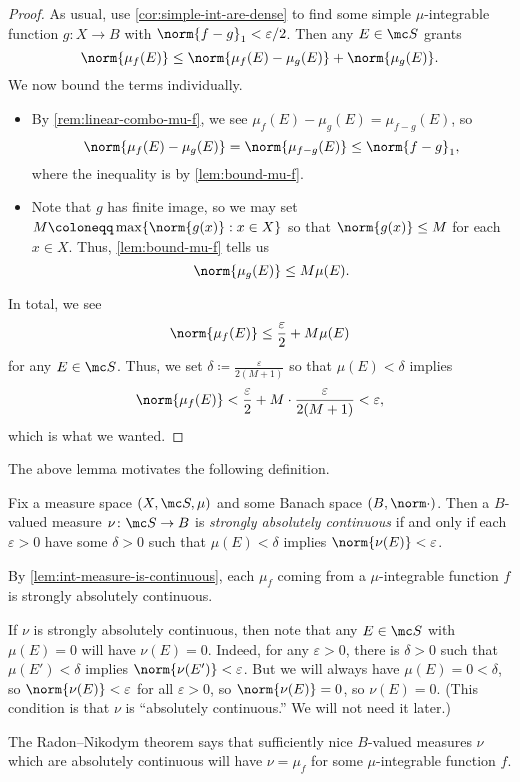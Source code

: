 \documentclass[../notes.tex]{subfiles}
\begin{document}
\begin{proof}
	As usual, use \autoref{cor:simple-int-are-dense} to find some simple $\mu$-integrable function $g\colon X\to B$ with $\norm{f-g}_1<\varepsilon/2$. Then any $E\in\mc S$ grants
	\[\norm{\mu_f(E)}\le\norm{\mu_f(E)-\mu_g(E)}+\norm{\mu_g(E)}.\]
	We now bound the terms individually.
	\begin{itemize}
		\item By \autoref{rem:linear-combo-mu-f}, we see $\mu_f(E)-\mu_g(E)=\mu_{f-g}(E)$, so
		\[\norm{\mu_f(E)-\mu_g(E)}=\norm{\mu_{f-g}(E)}\le\norm{f-g}_1,\]
		where the inequality is by \autoref{lem:bound-mu-f}.
		\item Note that $g$ has finite image, so we may set $M\coloneqq\max\{\norm{g(x)}:x\in X\}$ so that $\norm{g(x)}\le M$ for each $x\in X$. Thus, \autoref{lem:bound-mu-f} tells us
		\[\norm{\mu_g(E)}\le M\mu(E).\]
	\end{itemize}
	In total, we see
	\[\norm{\mu_f(E)}\le\frac\varepsilon2+M\mu(E)\]
	for any $E\in\mc S$. Thus, we set $\delta\coloneqq\frac\varepsilon{2(M+1)}$ so that $\mu(E)<\delta$ implies
	\[\norm{\mu_f(E)}<\frac\varepsilon2+M\cdot\frac\varepsilon{2(M+1)}<\varepsilon,\]
	which is what we wanted.
\end{proof}
The above lemma motivates the following definition.
\begin{definition}
	Fix a measure space $(X,\mc S,\mu)$ and some Banach space $(B,\norm\cdot)$. Then a $B$-valued measure $\nu\colon\mc S\to B$ is \textit{strongly absolutely continuous} if and only if each $\varepsilon>0$ have some $\delta>0$ such that $\mu(E)<\delta$ implies $\norm{\nu(E)}<\varepsilon$.
\end{definition}
\begin{example}
	By \autoref{lem:int-measure-is-continuous}, each $\mu_f$ coming from a $\mu$-integrable function $f$ is strongly absolutely continuous.
\end{example}
\begin{remark}
	If $\nu$ is strongly absolutely continuous, then note that any $E\in\mc S$ with $\mu(E)=0$ will have $\nu(E)=0$. Indeed, for any $\varepsilon>0$, there is $\delta>0$ such that $\mu(E')<\delta$ implies $\norm{\nu(E')}<\varepsilon$. But we will always have $\mu(E)=0<\delta$, so $\norm{\nu(E)}<\varepsilon$ for all $\varepsilon>0$, so $\norm{\nu(E)}=0$, so $\nu(E)=0$. (This condition is that $\nu$ is ``absolutely continuous.'' We will not need it later.)
\end{remark}
\begin{remark}
	The Radon--Nikodym theorem says that sufficiently nice $B$-valued measures $\nu$ which are absolutely continuous will have $\nu=\mu_f$ for some $\mu$-integrable function $f$.
\end{remark}
\end{document}
